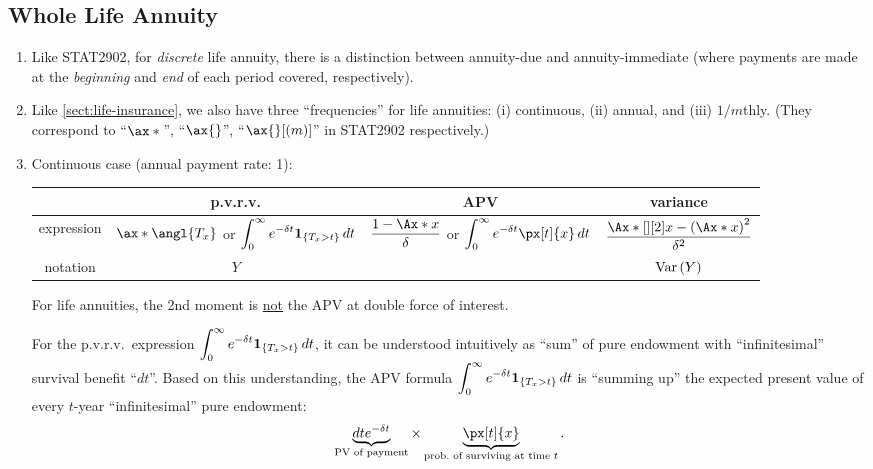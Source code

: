 \subsection{Whole Life Annuity}
\begin{enumerate}
\item Like STAT2902, for \emph{discrete} life annuity, there is a
distinction between annuity-due and annuity-immediate (where payments are made
at the \emph{beginning} and \emph{end} of each period covered, respectively).
\item Like \cref{sect:life-insurance}, we also have three ``frequencies'' for
life annuities: (i) continuous, (ii) annual, and (iii) \(1/m\)thly. (They
correspond to ``\(\ax*{}\)'', ``\(\ax{}\)'',  ``\(\ax{}[(m)]\)'' in
STAT2902 respectively.)
\item \label{it:cts-wl-annuity-fmlas}
Continuous case (annual payment rate: 1):

\begin{tabular}{cccc}
\toprule
&p.v.r.v.&APV&variance\\
\midrule
expression&\(\ax*{\angl{T_x}}\) or \(\displaystyle\int_{0}^{\infty}e^{-\delta t}\mathbf{1}_{\left\{T_x>t\right\}}\,dt\)
&\(\displaystyle \frac{1-\Ax*{x}}{\delta}\) or \(\displaystyle\int_{0}^{\infty}e^{-\delta t}\px[t]{x}\,dt\)
&\(\displaystyle \frac{\Ax*[][2]{x}-\qty(\Ax*{x})^2}{\delta^2}\)\\
notation&\(Y\)&{\(\ax*{x}\)}&\(\operatorname{Var}\qty(Y)\)\\
\bottomrule
\end{tabular}

\begin{warning}
For life annuities, the 2nd moment is \underline{not} the APV at double force
of interest.
\end{warning}

\begin{intuition}
For the p.v.r.v.\ expression \(\displaystyle\int_{0}^{\infty}e^{-\delta
t}\mathbf{1}_{\left\{T_x>t\right\}}\,dt\), it can be understood intuitively as ``sum'' of
pure endowment with ``infinitesimal'' survival benefit
 ``\(dt\)''. Based on this
understanding, the APV formula \(\displaystyle\int_{0}^{\infty}e^{-\delta
t}\mathbf{1}_{\left\{T_x>t\right\}}\,dt\) is ``summing up'' the expected present value of
 every \(t\)-year ``infinitesimal'' pure endowment:
\[
\underbrace{dte^{-\delta t}}_{\text{PV of payment}}\times\underbrace{\px[t]{x}}_{\text{prob.\ of surviving at time \(t\)}}.
\]
\end{intuition}


\end{enumerate}
